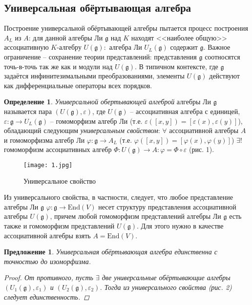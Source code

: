 \documentclass[12pt]{article}
\newtheorem{predl}[theorem]{Предложение}
\theoremstyle{definition}
\newtheorem{defin}[theorem]{Определение}
\begin{document}
\subsection{Универсальная обёртывающая алгебра}
Построение универсальной обёртывающей алгебры пытается процесс построения $A_L$ из $A$: для данной алгебры Ли $\mathfrak{g}$ над $K$ находят <<наиболее общую>> ассоциативную $K$-алгебру $U(\mathfrak{g}):$ алгебра Ли $U_L(\mathfrak{g})$ содержит $\mathfrak{g}$. Важное ограничение -- сохранение теории представлений: представления $\mathfrak{g}$ соотносятся точь-в-точь так же как и модули над $U(\mathfrak{g})$. В типичном контексте, где $\mathfrak{g}$ задаётся инфинитезимальными преобразованиями, элементы $U(\mathfrak{g})$ действуют как дифференциальные операторы всех порядков.
\begin{defin}
\textit{Универсальной обертывающей алгеброй} алгебры Ли $\mathfrak{g}$ называется пара $(U(\mathfrak{g}),\varepsilon)$, где $U(\mathfrak{g})$ -- ассоциативная алгебра с единицей, $\varepsilon:\mathfrak{g}\rightarrow U_L(\mathfrak{g})$ -- гомоморфизм алгебр Ли (т.е. $\varepsilon([x,y])=[\varepsilon(x),\varepsilon(y)]$), обладающий следующим \textit{универсальным свойством}: $\forall$ ассоциативной алгебры $A$ и гомоморфизма алгебр Ли $\varphi:\mathfrak{g}\rightarrow A_L$ (т.е. $\varphi([x,y])=[\varphi(x),\varphi(y)]$) $\exists !$ гомоморфизм ассоциативных алгебр $\Phi:U(\mathfrak{g}) \rightarrow A:\varphi=\Phi\circ\varepsilon$ (рис. 1).
\end{defin}
\begin{figure}
    \centering
    \texttt{[image: 1.jpg]}
    \caption{Универсальное свойство}
    \label{fig:my_label}
\end{figure}
Из универсального свойства, в частности, следует, что любое представление алгебры Ли $\mathfrak{g}$ $\varphi:\mathfrak{g}\rightarrow \text{End}(V)$ несет структуру представления ассоциативной алгебры $U(\mathfrak{g})$, причем любой гомоморфизм представлений алгебры Ли $\mathfrak{g}$ есть также и гомоморфизм представлений $U(\mathfrak{g})$. Для этого нужно в качестве ассоциативной алгебры взять $A=\text{End}(V)$.
\begin{predl}
Универсальная обёртывающая алгебра единственна с точностью до изоморфизма.
\begin{proof}
    От противного, пусть $\exists$ две универсальные обёртывающие алгебры $(U_1(\mathfrak{g}),\varepsilon_1)$ и $(U_2(\mathfrak{g}),\varepsilon_2)$. Тогда из универсального свойства (рис. 2) следует единственность.
\end{proof}
\end{predl}
\end{document}
